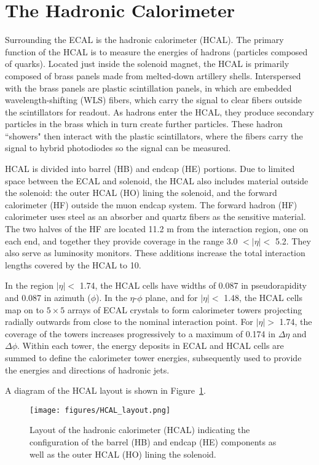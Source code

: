\section{The Hadronic Calorimeter}

Surrounding the ECAL is the hadronic calorimeter (HCAL). The primary function of the HCAL is to measure the energies of hadrons (particles composed of quarks). Located just inside the solenoid magnet, the HCAL is primarily composed of brass panels made from melted-down artillery shells. Interspersed with the brass panels are plastic scintillation panels, in which are embedded wavelength-shifting (WLS) fibers, which carry the signal to clear fibers outside the scintillators for readout. As hadrons enter the HCAL, they produce secondary particles in the brass which in turn create further particles. These hadron ``showers" then interact with the plastic scintillators, where the fibers carry the signal to hybrid photodiodes so the signal can be measured.

HCAL is divided into barrel (HB) and endcap (HE) portions. Due to limited space between the ECAL and solenoid, the HCAL also includes material outside the solenoid: the outer HCAL (HO) lining the solenoid, and the forward calorimeter (HF) outside the muon endcap system. The forward hadron (HF) calorimeter uses steel as an absorber and quartz fibers as the sensitive material. The two halves of the HF are located 11.2 m from the interaction region, one on each end, and together they provide coverage in the range 3.0 $< |\eta| <$ 5.2. They also serve as luminosity monitors. These additions increase the total interaction lengths covered by the HCAL to 10.\cite{TDR}

In the region $|\eta| < $ 1.74, the HCAL cells have widths of 0.087 in pseudorapidity and 0.087 in azimuth ($\phi$). In the $\eta$-$\phi$ plane, and for $|\eta| <$ 1.48, the HCAL cells map on to $5 \times 5$ arrays of ECAL crystals to form calorimeter towers projecting radially outwards from close to the nominal interaction point. For $|\eta| >$ 1.74, the coverage of the towers increases progressively to a maximum of 0.174 in $\Delta \eta$ and $\Delta \phi$. Within each tower, the energy deposits in ECAL and HCAL cells are summed to define the calorimeter tower energies, subsequently used to provide the energies and directions of hadronic jets.


A diagram of the HCAL layout is shown in Figure~\ref{fig:HCAL_layout}.

\begin{figure}\centering
  \texttt{[image: figures/HCAL\_layout.png]}
  \caption{\label{fig:HCAL_layout} Layout of the hadronic calorimeter (HCAL) indicating the configuration of the barrel (HB) and endcap (HE) components as well as the outer HCAL (HO) lining the solenoid.}
\end{figure}

